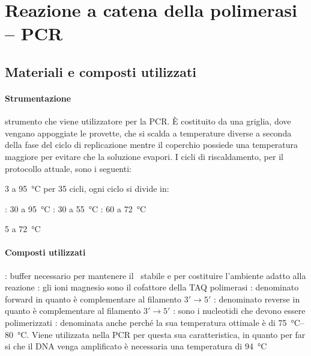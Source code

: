 \section{Reazione a catena della polimerasi -- PCR}

\subsection{Materiali e composti utilizzati}
\paragraph{Strumentazione}
\begin{itemize}[person]
	\itemb[Termociclatore:]\label{it:termociclatore} strumento che viene utilizzatore per la PCR. È costituito da una griglia, dove vengano appoggiate le provette, che si scalda a temperature diverse a seconda della fase del ciclo di replicazione mentre il coperchio possiede una temperatura maggiore per evitare che la soluzione evapori.
	I cicli di riscaldamento, per il protocollo attuale, sono i seguenti:
	\begin{itemize}[squareItem]
		 \qty{3}{\min} a \qty{95}{\celsius}
		\itemb[Amplificazione] per 35 cicli, ogni ciclo si divide in:
		\begin{itemize}[squareItem]
			\itemb[Denaturazione]: \qty{30}{\sec} a \qty{95}{\celsius}
			\itemb[Ibridazione]: \qty{30}{\sec} a \qty{55}{\celsius}
			\itemb[Estensione]: \qty{60}{\sec} a \qty{72}{\celsius}
		\end{itemize}
		 \qty{5}{\min} a \qty{72}{\celsius}
	\end{itemize}
\end{itemize}

\paragraph{Composti utilizzati}
\begin{itemize}[person]
	: buffer necessario per mantenere il \pH\ stabile e per costituire l'ambiente adatto alla reazione
	\itemb[\ch{MgCl2}]: gli ioni magnesio  sono il cofattore della TAQ polimerasi
	: denominato \foreignlanguage{english}{forward} in quanto è complementare al filamento \(3' \rightarrow 5'\)
	: denominato \foreignlanguage{english}{reverse} in quanto è complementare al filamento \(3' \rightarrow 5'\)
	: sono i nucleotidi che devono essere polimerizzati
	: denominata anche  perché la sua temperatura ottimale è di \qtyrange{75}{80}{\celsius}. Viene utilizzata nella PCR per questa sua caratteristica, in quanto per far si che il DNA venga amplificato è necessaria una temperatura di \qty{94}{\celsius}
\end{itemize}

